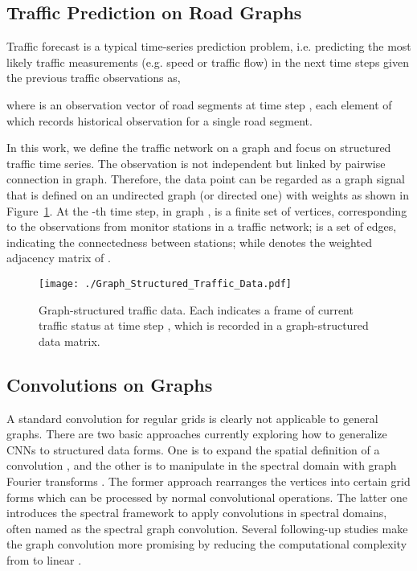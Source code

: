 \documentclass{article}
\begin{document}
\subsection{Traffic Prediction on Road Graphs}
Traffic forecast is a typical time-series prediction problem, i.e. predicting the most likely traffic measurements (e.g. speed or traffic flow) in the next  time steps given the previous  traffic observations as, 

where  is an observation vector of  road segments at time step , each element of which records historical observation for a single road segment.

In this work, we define the traffic network on a graph and focus on structured traffic time series. The observation  is not independent but linked by pairwise connection in graph. Therefore, the data point  can be regarded as a graph signal that is defined on an undirected graph (or directed one)  with weights  as shown in Figure~\ref{fig:tensor}. At the -th time step, in graph ,  is a finite set of vertices, corresponding to the observations from  monitor stations in a traffic network;  is a set of edges, indicating the connectedness between stations; while  denotes the weighted adjacency matrix of .

\begin{figure}
	\centering
	\texttt{[image: ./Graph\_Structured\_Traffic\_Data.pdf]}
	\caption{\label{fig:tensor}Graph-structured traffic data. Each  indicates a frame of current traffic status at time step , which is recorded in a graph-structured data matrix.}
\end{figure}

\subsection{Convolutions on Graphs} 
A standard convolution for regular grids is clearly not applicable to general graphs. There are two basic approaches currently exploring how to generalize CNNs to structured data forms. One is to expand the spatial definition of a convolution \cite{niepert2016learning}, and the other is to manipulate in the spectral domain with graph Fourier transforms \cite{bruna2013spectral}. The former approach rearranges the vertices into certain grid forms which can be processed by normal convolutional operations. The latter one introduces the spectral framework to apply convolutions in spectral domains, often named as the spectral graph convolution. Several following-up studies make the graph convolution more promising by reducing the computational complexity from  to linear \cite{defferrard2016convolutional,kipf2016semi}.
\end{document}

